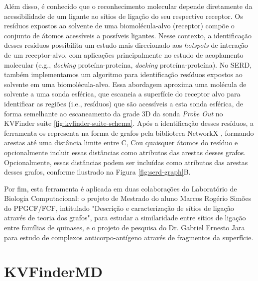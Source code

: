 \documentclass[Portugues]{phdquali}
\def\ie{i.e.\onedot}
\def\eg{e.g.\onedot}
\begin{document}
Além disso, é conhecido que o reconhecimento molecular depende diretamente da acessibilidade de um ligante ao sítios de ligação do seu respectivo receptor. Os resíduos expostos ao solvente de uma biomolécula-alvo (receptor) compõe o conjunto de átomos acessíveis a possíveis ligantes. Nesse contexto, a identificação desses resíduos possibilita um estudo mais direcionado aos \textit{hotspots} de interação de um receptor-alvo, com aplicações principalmente no estudo de acoplamento molecular (\eg, \textit{docking} proteína-proteína, \textit{docking} proteína-proteína). No SERD, também implementamos um algoritmo para identificação resíduos expostos ao solvente em uma biomolécula-alvo. Essa abordagem aproxima uma molécula de solvente a uma sonda esférica, que escaneia a superfície do receptor alvo para identificar as regiões (\ie, resíduos) que são acessíveis a esta sonda esférica, de forma semelhante ao escaneamento da grade 3D da sonda \textit{Probe Out} no KVFinder suite \ref{fig:kvfinder-suite-schema}. Após a identificação desses resíduos, a ferramenta os representa na forma de grafos pela biblioteca NetworkX \cite{networkx}, formando arestas até uma distância limite entre C\textalpha, C\textbeta\space ou quaisquer átomos do resíduo e opcionalmente incluir essas distâncias como atributos das arestas desses grafos. Opcionalmente, essas distâncias podem ser incluídas como atributos das arestas desses grafos, conforme ilustrado na Figura \ref{fig:serd-graph}B.

Por fim, esta ferramenta é aplicada em duas colaborações do Laboratório de Biologia Computacional: o projeto de Mestrado do aluno Marcos Rogério Simões do PPGCF/FCF, intitulado "Descrição e caracterização de sítios de ligação através de teoria dos grafos", para estudar a similaridade entre sítios de ligação entre famílias de quinases, e o projeto de pesquisa do Dr. Gabriel Ernesto Jara para estudo de complexos anticorpo-antígeno através de fragmentos da superfície.

\section{KVFinderMD}
\end{document}

